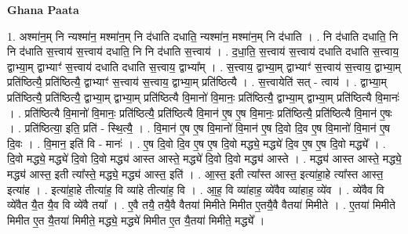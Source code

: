 \documentclass[17pt]{extarticle}
\begin{document}
\textbf{Ghana Paata } \newline

1. अश्मा॑न॒म् नि न्यश्मा॑न॒ मश्मा॑न॒म् नि द॑धाति दधाति॒ न्यश्मा॑न॒ मश्मा॑न॒म् नि द॑धाति । . नि द॑धाति दधाति॒ नि नि द॑धाति स॒त्त्वाय॑ स॒त्त्वाय॑ दधाति॒ नि नि द॑धाति स॒त्त्वाय॑ । . द॒धा॒ति॒ स॒त्त्वाय॑ स॒त्त्वाय॑ दधाति दधाति स॒त्त्वाय॒ द्वाभ्या॒म् द्वाभ्याꣳ॑ स॒त्त्वाय॑ दधाति दधाति स॒त्त्वाय॒ द्वाभ्या᳚म् । . स॒त्त्वाय॒ द्वाभ्या॒म् द्वाभ्याꣳ॑ स॒त्त्वाय॑ स॒त्त्वाय॒ द्वाभ्या॒म् प्रति॑ष्ठित्यै॒ प्रति॑ष्ठित्यै॒ द्वाभ्याꣳ॑ स॒त्त्वाय॑ स॒त्त्वाय॒ द्वाभ्या॒म् प्रति॑ष्ठित्यै । . स॒त्त्वायेति॑ सत् - त्वाय॑ । . द्वाभ्या॒म् प्रति॑ष्ठित्यै॒ प्रति॑ष्ठित्यै॒ द्वाभ्या॒म् द्वाभ्या॒म् प्रति॑ष्ठित्यै वि॒मानो॑ वि॒मानः॒ प्रति॑ष्ठित्यै॒ द्वाभ्या॒म् द्वाभ्या॒म् प्रति॑ष्ठित्यै वि॒मानः॑ । . प्रति॑ष्ठित्यै वि॒मानो॑ वि॒मानः॒ प्रति॑ष्ठित्यै॒ प्रति॑ष्ठित्यै वि॒मान॑ ए॒ष ए॒ष वि॒मानः॒ प्रति॑ष्ठित्यै॒ प्रति॑ष्ठित्यै वि॒मान॑ ए॒षः । . प्रति॑ष्ठित्या॒ इति॒ प्रति॑ - स्थि॒त्यै॒ । . वि॒मान॑ ए॒ष ए॒ष वि॒मानो॑ वि॒मान॑ ए॒ष दि॒वो दि॒व ए॒ष वि॒मानो॑ वि॒मान॑ ए॒ष दि॒वः । . वि॒मान॒ इति॑ वि - मानः॑ । . ए॒ष दि॒वो दि॒व ए॒ष ए॒ष दि॒वो मद्ध्ये॒ मद्ध्ये॑ दि॒व ए॒ष ए॒ष दि॒वो मद्ध्ये᳚ । . दि॒वो मद्ध्ये॒ मद्ध्ये॑ दि॒वो दि॒वो मद्ध्य॑ आस्त आस्ते॒ मद्ध्ये॑ दि॒वो दि॒वो मद्ध्य॑ आस्ते । . मद्ध्य॑ आस्त आस्ते॒ मद्ध्ये॒ मद्ध्य॑ आस्त॒ इती त्या᳚स्ते॒ मद्ध्ये॒ मद्ध्य॑ आस्त॒ इति॑ । . आ॒स्त॒ इती त्या᳚स्त आस्त॒ इत्या॑हा॒हे त्या᳚स्त आस्त॒ इत्या॑ह । . इत्या॑हा॒हे तीत्या॑ह॒ वि व्या॑हे तीत्या॑ह॒ वि । . आ॒ह॒ वि व्या॑हाह॒ व्ये॑वैव व्या॑हाह॒ व्ये॑व । . व्ये॑वैव वि व्ये॑वैत यै॒त यै॒व वि व्ये॑वै तया᳚ । . ए॒वै तयै॒ तयै॒वै वैतया॑ मिमीते मिमीत ए॒तयै॒वै वैतया॑ मिमीते । . ए॒तया॑ मिमीते मिमीत ए॒त यै॒तया॑ मिमीते॒ मद्ध्ये॒ मद्ध्ये॑ मिमीत ए॒त यै॒तया॑ मिमीते॒ मद्ध्ये᳚ । \newline
\end{document}
